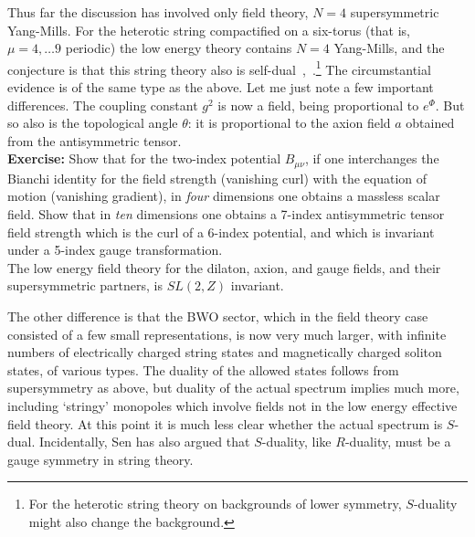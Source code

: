 Thus far the discussion has involved only field theory, $N=4$
supersymmetric Yang-Mills.  For the heterotic string compactified on
a six-torus (that is, $\mu = 4, \ldots 9$ periodic) the low energy
theory contains $N=4$ Yang-Mills, and the conjecture is that this
string theory also is
self-dual~\cite{FILQ},~\cite{Senrev}.\footnote{For the heterotic
string theory on backgrounds of lower symmetry,
$S$-duality might also change the background.}  The circumstantial
evidence is of the same type as the above.  Let me just note a few
important differences.  The coupling constant $g^2$ is now a field,
being proportional to
$e^{\Phi}$. But so also is the topological angle $\theta$: it is
proportional to the axion field $a$ obtained from the antisymmetric
tensor.\\[3pt]
{\bf Exercise:} Show that for the two-index potential $B_{\mu\nu}$, if
one interchanges the Bianchi identity for the field strength
(vanishing curl) with the equation of motion (vanishing gradient), in
{\it four} dimensions one obtains a massless scalar field.  Show that
in {\it ten} dimensions one obtains a 7-index antisymmetric tensor
field strength which is the curl of a 6-index potential, and which is
invariant under a 5-index gauge transformation.\\[3pt]
The low energy field theory for the dilaton, axion, and gauge fields,
and their supersymmetric partners, is $SL(2,Z)$ invariant.

The other difference is that the BWO sector, which in the field
theory case consisted of a few small representations, is now very much
larger, with infinite numbers of electrically charged string states
and magnetically charged soliton states, of various types.  The duality
of the allowed states follows from supersymmetry as above, but
duality of the actual spectrum implies much more,
including `stringy'
monopoles which involve fields not in the low energy effective field
theory.  At this point it is much less clear whether the actual
spectrum is $S$-dual.  Incidentally,
Sen has also argued that $S$-duality, like $R$-duality, must be a
gauge symmetry in string theory.


